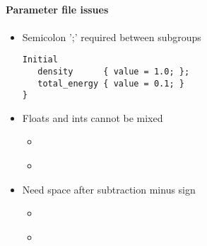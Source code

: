 \NEWSEC

\subsection{\ssIssues}

\begin{frame}[fragile,label=ss-issues] 
\secframetitle{\ssIssues}
\framesubtitle{Parameter file issues}

\begin{itemize}
  \item Semicolon ';' required between subgroups
  \begin{verbatim}
Initial
   density      { value = 1.0; };
   total_energy { value = 0.1; }
}
   \end{verbatim}\vspace{-0.1in}
   \item Floats and ints cannot be mixed
   \begin{itemize}
     \item[\frownie] \textcolor{red}{}
     \item[\smiley] \textcolor{green!50!black}{}
   \end{itemize}

   \item Need space after subtraction minus sign
   \begin{itemize}
     \item[\frownie] \textcolor{red}{}
     \item[\smiley] \textcolor{green!50!black}{}
   \end{itemize}
\end{itemize}
\end{frame}


